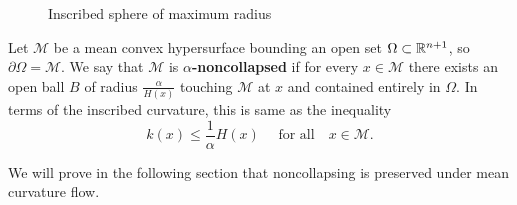 \begin{comment}
    The inscribed curvature is greater than the largest principal curvature, which can be proved in the following fashion. 
\newpage
\begin{lemma}
    Let $ \mathcal{M} $ be an embedded hypersurface in $ \Rn $ and the inscribed curvature be defined as above. Then for any point $ x \in \mathcal{M} $,
    \[ k(x) \ge \kappa_{n}(x) \]
    where $ \kappa_{1}(x) \le \ldots \le \kappa_{n}(x) $ are the principal curvatures of the hypersurface at the point $ x  $.
\end{lemma}
\begin{proof}
    TO DO
\end{proof}
\end{comment}
\begin{figure}[h]
    \centering
    \caption{Inscribed sphere of maximum radius}
\end{figure}

\begin{defn}
    Let $ \mathcal{M} $ be a mean convex hypersurface bounding an open set $ \Omega \subset \mathbb{R}^{n+1}$, so $ \partial \Omega = \mathcal{M} $. We say that $ \mathcal{M} $ is \textbf{$ \alpha $-noncollapsed}  if for every $ x \in \mathcal{M} $ there exists an open ball $ B $ of radius $ \frac{\alpha}{H(x)} $ touching $ \mathcal{M} $ at $ x $ and contained entirely in $ \Omega $. In terms of the inscribed curvature, this is same as the inequality \begin{equation}
        k(x) \le \frac{1}{\alpha} H(x) \quad \text{ for all} \quad x \in \mathcal{M}.
    \end{equation}
\end{defn}
We will prove in the following section that noncollapsing is preserved under mean curvature flow.
